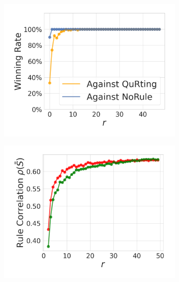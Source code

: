 \documentclass{article}
\begin{document}
\begin{figure}[H]
\centering
\begin{subfigure}{0.3\textwidth}
  \centering
  \includegraphics[width=1.0\linewidth]{figures/EvalA_IMDB_Single_winning_rate.pdf}
  \caption{}
  \label{fig:EvalA_IMDB_Single_winning_rate}
\end{subfigure}
\begin{subfigure}{0.297\textwidth}
  \centering
  \includegraphics[width=1.0\linewidth]{figures/EvalA_IMDB_Single_dpp_vs_random_RC.pdf}
  \caption{}
  \label{fig:EvalA_IMDB_Single_dpp_vs_random_RC}
\end{subfigure}
\begin{subfigure}{0.3\textwidth}

\end{subfigure}
\end{figure}
\end{document}
